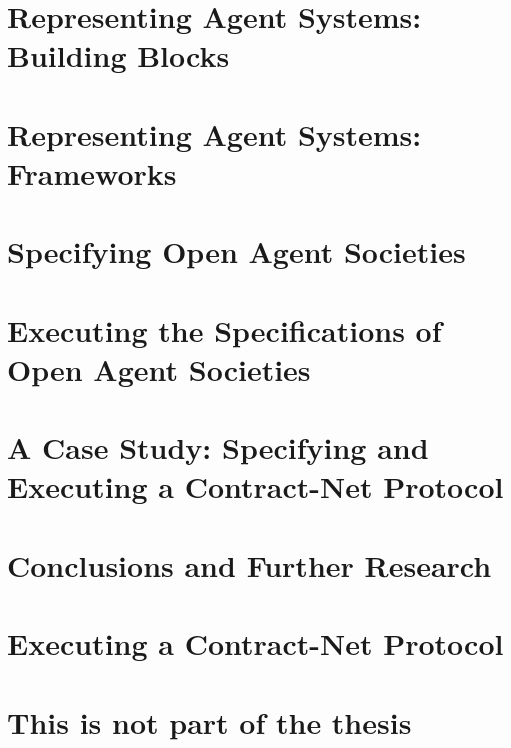 \documentclass[10pt,a4paper]{report}
\begin{document}



\chapter{Representing Agent Systems: Building Blocks\label{chap:background1}}





\chapter{Representing Agent Systems: Frameworks\label{chap:background2}}





\chapter{Specifying Open Agent Societies\label{chap:theoretical}}





\chapter{Executing the Specifications of Open Agent Societies\label{chap:computational}}




\chapter{A Case Study: Specifying and Executing a Contract-Net Protocol\label{chap:cnp}}





\chapter{Conclusions and Further Research\label{chap:conclusions}}







%







\appendix

\chapter{Executing a Contract-Net Protocol \label{chap:appendixA}}




\chapter{This is not part of the thesis}





\renewcommand{\thefootnote}{\@arabic\c@figure}

\makeatother
\end{document}
